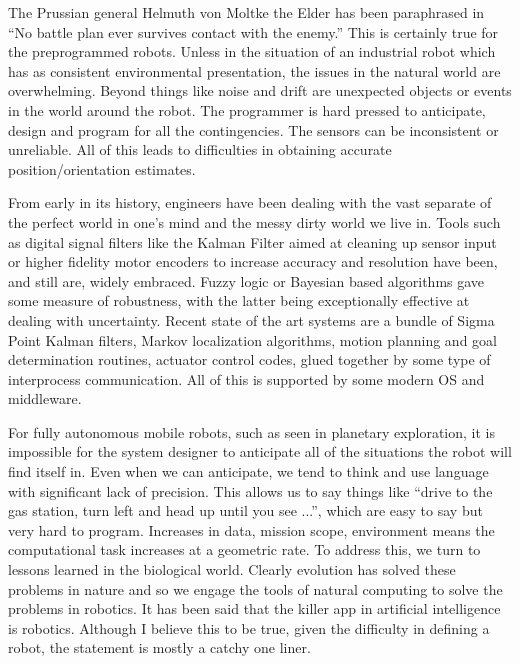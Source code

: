 The Prussian general Helmuth von Moltke the Elder has been paraphrased
in ``No battle plan ever survives contact with the enemy.'' This is
certainly true for the preprogrammed robots. Unless in the situation of
an industrial robot which has as consistent environmental presentation,
the issues in the natural world are overwhelming. Beyond things like
noise and drift are unexpected objects or events in the world around the
robot. The programmer is hard pressed to anticipate, design and program
for all the contingencies. The sensors can be inconsistent or
unreliable. All of this leads to difficulties in obtaining accurate
position/orientation estimates.

From early in its history, engineers have been dealing with the vast
separate of the perfect world in one's mind and the messy dirty world we
live in. Tools such as digital signal filters like the Kalman Filter
aimed at cleaning up sensor input or higher fidelity motor encoders to
increase accuracy and resolution have been, and still are, widely
embraced. Fuzzy logic or Bayesian based algorithms gave some measure of
robustness, with the latter being exceptionally effective at dealing
with uncertainty. Recent state of the art systems are a bundle of Sigma
Point Kalman filters, Markov localization algorithms, motion planning
and goal determination routines, actuator control codes, glued together
by some type of interprocess communication. All of this is supported by
some modern OS and middleware.

For fully autonomous mobile robots, such as seen in planetary
exploration, it is impossible for the system designer to anticipate all
of the situations the robot will find itself in. Even when we can
anticipate, we tend to think and use language with significant lack of
precision. This allows us to say things like ``drive to the gas station,
turn left and head up until you see ...'', which are easy to say but
very hard to program. Increases in data, mission scope, environment
means the computational task increases at a geometric rate. To address
this, we turn to lessons learned in the biological world. Clearly
evolution has solved these problems in nature and so we engage the tools
of natural computing to solve the problems in robotics. It has been said
that the killer app in artificial intelligence is robotics. Although I
believe this to be true, given the difficulty in defining a robot, the
statement is mostly a catchy one liner.

